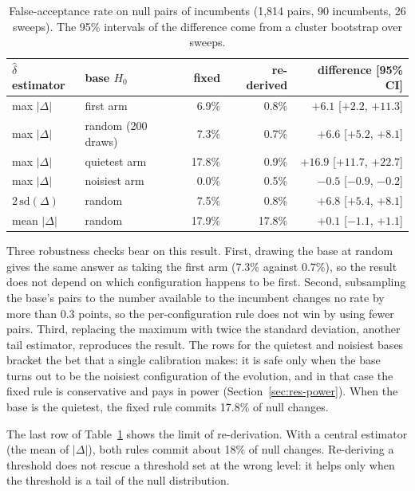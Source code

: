 \begin{table}[t]
\centering
\caption{False-acceptance rate on null pairs of incumbents (1{,}814 pairs, 90
incumbents, 26 sweeps). The 95\% intervals of the difference come from a cluster
bootstrap over sweeps.}\label{tab:fixed}
\begin{tabular}{llrrr}
\toprule
$\hat\delta$ estimator & base $H_0$ & fixed & re-derived & difference [95\% CI] \\
\midrule
max $|\Delta|$ & first arm & 6.9\% & 0.8\% & $+6.1$ [$+2.2$, $+11.3$] \\
max $|\Delta|$ & random (200 draws) & 7.3\% & 0.7\% & $+6.6$ [$+5.2$, $+8.1$] \\
max $|\Delta|$ & quietest arm & 17.8\% & 0.9\% & $+16.9$ [$+11.7$, $+22.7$] \\
max $|\Delta|$ & noisiest arm & 0.0\% & 0.5\% & $-0.5$ [$-0.9$, $-0.2$] \\
$2\,\mathrm{sd}(\Delta)$ & random & 7.5\% & 0.8\% & $+6.8$ [$+5.4$, $+8.1$] \\
mean $|\Delta|$ & random & 17.9\% & 17.8\% & $+0.1$ [$-1.1$, $+1.1$] \\
\bottomrule
\end{tabular}
\end{table}

Three robustness checks bear on this result. First, drawing the base at random
gives the same answer as taking the first arm (7.3\% against 0.7\%), so the
result does not depend on which configuration happens to be first. Second,
subsampling the base's pairs to the number available to the incumbent changes no
rate by more than 0.3 points, so the per-configuration rule does not win by using
fewer pairs. Third, replacing the maximum with twice the standard deviation,
another tail estimator, reproduces the result. The rows for the quietest and
noisiest bases bracket the bet that a single calibration makes: it is safe only
when the base turns out to be the noisiest configuration of the evolution, and
in that case the fixed rule is conservative and pays in power
(Section~\ref{sec:res-power}). When the base is the quietest, the fixed rule
commits 17.8\% of null changes.

The last row of Table~\ref{tab:fixed} shows the limit of re-derivation. With a
central estimator (the mean of $|\Delta|$), both rules commit about 18\% of null
changes. Re-deriving a threshold does not rescue a threshold set at the wrong
level: it helps only when the threshold is a tail of the null distribution.

